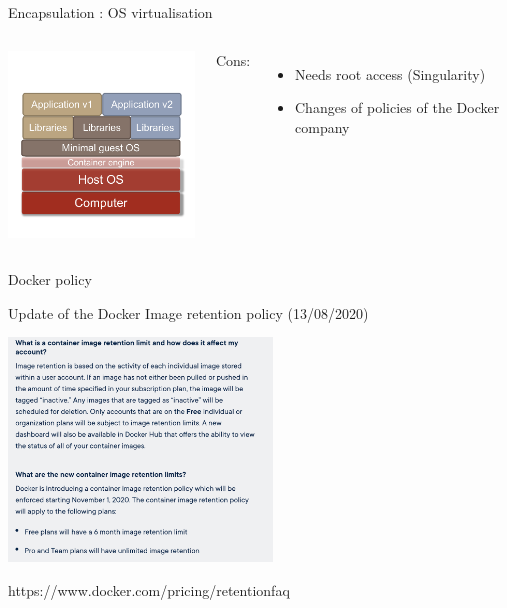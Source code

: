 \begin{frame}{Encapsulation : OS virtualisation}
\begin{columns}

\includegraphics[width=6cm]{02_encapsulation/figures/intro_docker_60.pdf}


Cons:
\begin{itemize}
  \item Needs root access (Singularity)
  \item Changes of policies of the Docker company
\end{itemize}

\end{columns}
\end{frame}


\begin{frame}{Docker policy}

\centering Update of the Docker Image retention policy (13/08/2020)

\includegraphics[width=7cm]{02_encapsulation/images/docker_image_retention_policy.png}

https://www.docker.com/pricing/retentionfaq

\end{frame}

